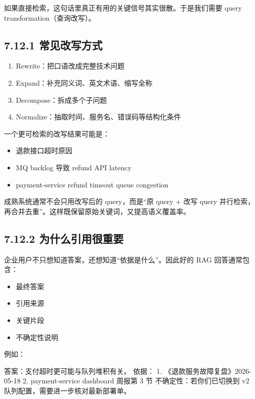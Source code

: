 如果直接检索，这句话里真正有用的关键信号其实很散。于是我们需要 query transformation（查询改写）。


\subsection{7.12.1 常见改写方式}

\begin{enumerate}[leftmargin=2em]
\item Rewrite：把口语改成完整技术问题
\item Expand：补充同义词、英文术语、缩写全称
\item Decompose：拆成多个子问题
\item Normalize：抽取时间、服务名、错误码等结构化条件
\end{enumerate}

一个更可检索的改写结果可能是：


\begin{itemize}[leftmargin=2em]
\item 退款接口超时原因
\item MQ backlog 导致 refund API latency
\item payment-service refund timeout queue congestion
\end{itemize}

成熟系统通常不会只用改写后的 query，而是``原 query + 改写 query 并行检索，再合并去重''。这样既保留原始关键词，又提高语义覆盖率。


\subsection{7.12.2 为什么引用很重要}

企业用户不只想知道答案，还想知道``依据是什么''。因此好的 RAG 回答通常包含：


\begin{itemize}[leftmargin=2em]
\item 最终答案
\item 引用来源
\item 关键片段
\item 不确定性说明
\end{itemize}

例如：


\begin{codeblock}
答案：支付超时更可能与队列堆积有关。
依据：
1. 《退款服务故障复盘》2026-05-18
2. payment-service dashboard 周报第 3 节
不确定性：若你们已切换到 v2 队列配置，需要进一步核对最新部署单。
\end{codeblock}

